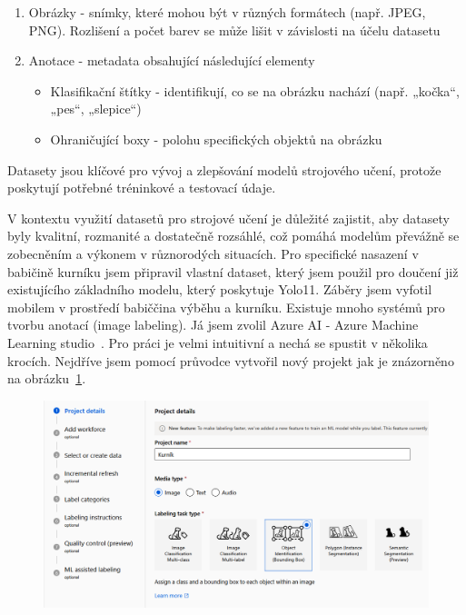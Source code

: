 \begin{enumerate}
    \item Obrázky - snímky, které mohou být v různých formátech (např. JPEG, PNG). Rozlišení a počet barev se může lišit v závislosti na účelu datasetu
    \item Anotace - metadata obsahující následující elementy
    \begin{itemize}
        \item Klasifikační štítky - identifikují, co se na obrázku nachází (např. „kočka“, „pes“, „slepice“)
        \item Ohraničující boxy - polohu specifických objektů na obrázku
    \end{itemize}
\end{enumerate}

Datasety jsou klíčové pro vývoj a zlepšování modelů strojového učení, protože poskytují potřebné tréninkové a testovací údaje.

V kontextu využití datasetů pro strojové učení je důležité zajistit, aby datasety byly kvalitní, rozmanité a dostatečně rozsáhlé, což pomáhá modelům převážně se zobecněním a výkonem v různorodých situacích.
Pro specifické nasazení v babičině kurníku jsem připravil vlastní dataset, který jsem použil pro doučení již existujícího základního modelu, který poskytuje Yolo11.
Záběry jsem vyfotil mobilem v prostředí babiččina výběhu a kurníku.
Existuje mnoho systémů pro tvorbu anotací (image labeling).
Já jsem zvolil Azure AI - Azure Machine Learning studio~\cite{aml}.
Pro práci je velmi intuitivní a nechá se spustit v několika krocích.
Nejdříve jsem pomocí průvodce vytvořil nový projekt jak je znázorněno na obrázku~\ref{fig:create_learning_project}.

\begin{figure}[H]
    \centering
    \includegraphics[width=1.0\textwidth]{img/create_learning_project}
    \label{fig:create_learning_project}
\end{figure}


